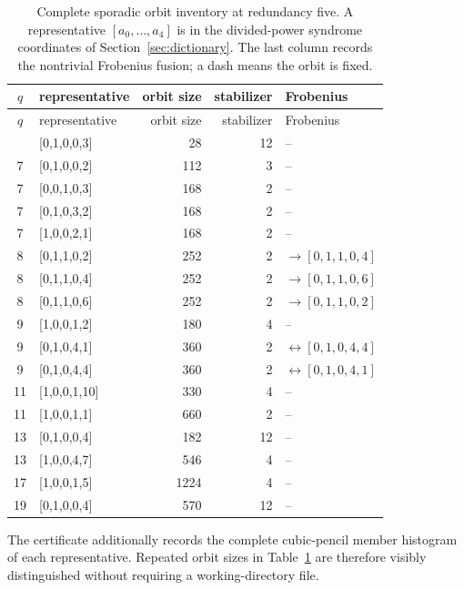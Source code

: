 \pagebreak[4]
\begin{longtable}{c>{\ttfamily\small}lrrl}
\caption{Complete sporadic orbit inventory at redundancy five.  A
representative $[a_0,\ldots,a_4]$ is in the divided-power syndrome
coordinates of Section~\ref{sec:dictionary}.  The last column records
the nontrivial Frobenius fusion; a dash means the orbit is fixed.}
\label{tab:r5sporadic}\\
\toprule
$q$ & \normalfont representative & orbit size & stabilizer & Frobenius\\
\midrule
\endfirsthead
\toprule
$q$ & \normalfont representative & orbit size & stabilizer & Frobenius\\
\midrule
\endhead
\bottomrule
\endfoot
7  & [0,1,0,0,3] & 28  & 12 & --\\
7  & [0,1,0,0,2] & 112 & 3  & --\\
7  & [0,0,1,0,3] & 168 & 2  & --\\
7  & [0,1,0,3,2] & 168 & 2  & --\\
7  & [1,0,0,2,1] & 168 & 2  & --\\
8  & [0,1,1,0,2] & 252 & 2  & $\to[0,1,1,0,4]$\\
8  & [0,1,1,0,4] & 252 & 2  & $\to[0,1,1,0,6]$\\
8  & [0,1,1,0,6] & 252 & 2  & $\to[0,1,1,0,2]$\\
9  & [1,0,0,1,2] & 180 & 4  & --\\
9  & [0,1,0,4,1] & 360 & 2  & $\leftrightarrow[0,1,0,4,4]$\\
9  & [0,1,0,4,4] & 360 & 2  & $\leftrightarrow[0,1,0,4,1]$\\
11 & [1,0,0,1,10]& 330 & 4  & --\\
11 & [1,0,0,1,1] & 660 & 2  & --\\
13 & [0,1,0,0,4] & 182 & 12 & --\\
13 & [1,0,0,4,7] & 546 & 4  & --\\
17 & [1,0,0,1,5] & 1224& 4  & --\\
19 & [0,1,0,0,4] & 570 & 12 & --\\
\end{longtable}

The certificate additionally records the complete cubic-pencil member
histogram of each representative.  Repeated orbit sizes in
Table~\ref{tab:r5sporadic} are therefore visibly distinguished without
requiring a working-directory file.

